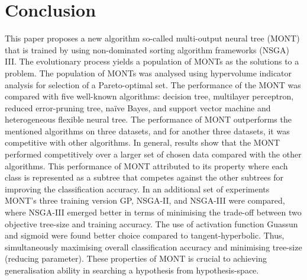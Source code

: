 \documentclass[conference]{IEEEtran}
\begin{document}
\section{Conclusion}
\label{sec:con}
This paper proposes a new algorithm so-called multi-output neural tree (MONT) that is trained by using non-dominated sorting algorithm frameworks (NSGA) III. The evolutionary process yields a population of MONTs as the solutions to a problem. The population of MONTs was analysed using hypervolume indicator analysis for selection of a Pareto-optimal set. The performance of the MONT was compared with five well-known algorithms: decision tree, multilayer perceptron, reduced error-pruning tree, na{\"{i}}ve Bayes, and support vector machine and heterogeneous flexible neural tree. The performance of MONT outperforms the mentioned algorithms on three datasets, and for another three datasets, it was competitive with other algorithms. In general, results show that the MONT performed competitively over a larger set of chosen data compared with the other algorithms. This performance of MONT attributed to its property where each class is represented as a subtree that competes against the other subtrees for improving the classification accuracy. In an additional set of experiments MONT's three training version GP, NSGA-II, and NSGA-III were compared, where NSGA-III emerged better in terms of minimising the trade-off between two objective tree-size and training accuracy. The use of activation function Guassun and sigmoid were found better choice compared to tangent-hyperbolic. Thus, simultaneously maximising overall classification accuracy and minimising tree-size (reducing parameter). These properties of MONT is crucial to achieving generalisation ability in searching a hypothesis from hypothesis-space. 




\end{document}
